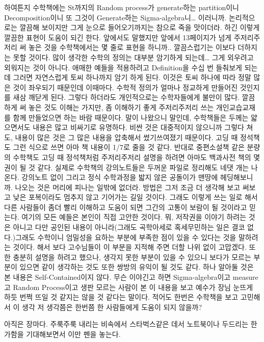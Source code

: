 \documentclass[
]{book}
\begin{document}
{{{하여튼지 수학책에는 St까지의 Random process가 generate하는 partition이니 Decomposition이니 또 그것이 Generate하는 Sigma-algebra니\ldots{} 이러니까. 논리적으로는 깔끔해 보이지만 그게 눈으로 들어오기까지는 참으로 죽을 맛이더라. 하긴 이렇게 깔끔한 표현이 도움이 되긴 한다. 앞에서도 말했지만 앞에서 13페이지가 넘게 주저리주저리 써 놓은 것을 수학책에서는 몇 줄로 표현을 하니까.. 깔끔스럽기는 이보다 더하지는 못할 것이다. 많이 생각한 수학의 정의는 대부분 암기하게 되는데\ldots{} 그게 외우려고 외워지는 것이 아니다. 애매한 예들을 적용하려고 Definition을 수십 번 들춰보게 되는데 그러면 자연스럽게 토씨 하나까지 암기 하게 된다. 이것은 토씨 하나에 따라 정말 많은 것이 좌우되기 때문인데 이때마다. 수학적 정의가 얼마나 정교하게 만들어진 것인지를 새삼 깨닫게 된다. 그렇다 하더라도 개인적으로는 수학자들에게 불만이 많다. 깔끔하게 써 놓은 것도 이해는 가지만, 좀 이해하기 좋게 주저리주저리 쓰는 개인교습교재를 함께 만들었으면 하는 바람 때문이다. 말이 나왔으니 말인데, 수학책들은 두께는 얇으면서도 내용은 많고 비싸기로 유명하다. 비싼 것은 대중적이지 않으니까 그렇다 쳐도, 내용이 많은 것은 그 많은 내용을 압축해서 썼기쓰여졌기 때문이다. 고딩 때 정석책도 그런 식으로 쓰면 아마 책 내용이 1/7로 줄을 것 같다. 반대로 중편소설책 같은 분량의 수학책도 고딩 때 정석책처럼 주저리주저리 설명을 하려면 아마도 백과사전 책의 몇 권이 될 것 같다. 실제로 수학책의 강의노트들은 두꺼운 파일로 정리해도 네댓 개는 나온다. 강의노트 없이 그리고 정식 수학과정을 밟지 않은 공돌이가 맨땅에 헤딩해보니까. 나오는 것은 머리에 피나는 일밖에 없더라. 방법은 그저 조금 더 생각해 보고 써보고 낮은 포복이라도 멈추지 않고 기어가는 길일 것이다. 그래도 이렇게 쓰는 일로 해서 다른 사람들이 좀더 빨리 이해하고 도움이 되면 그간의 고통이 보람이 될 것이라고 믿는다. 여기의 모든 예들은 본인이 직접 고안한 것이다. 뭐, 저작권을 이야기 하려는 것은 아니고 다만 공인된 내용이 아니라(그래도 곡학아세로 혹세무민하는 일은 결코 없다.)그래도 수학이니 엄밀성을 요하는 부분에 부족한 점이 있을 수 있다는 것을 말하려는 것이다. 해서 보다 고수님들이 이 부분을 지적해 주면 더할 나위 없이 고맙겠다. 또한 충분히 설명을 하려고 했으나, 생각지 못한 부분이 있을 수 있으니 보다가 모르는 부분이 있으면 같이 생각하는 것도 또한 쌍방의 유익이 될 것도 같다. 하나 알아둘 것은 본 내용은 Self-Contained이지 않다. 무슨 이야긴고 하면 Sigma-algebra이고 measure고 Random Process이고 생판 모르는 사람이 본 이 내용을 보고 예수가 장님 눈뜨게 하듯 번쩍 뜨일 것 같지는 않을 것 같다는 말이다. 적어도 한번은 수학책을 보고 고민해서 이 생각 저 생각쯤은 한번쯤 한 사람들에게 도움이 되지 않을까?

아직은 장마다. 주룩주룩 내리는 비속에서 스타벅스같은 데서 노트북이나 두드리는 한가함을 기대해보면서 이만 펜을 놓는다.

}}}
\end{document}
